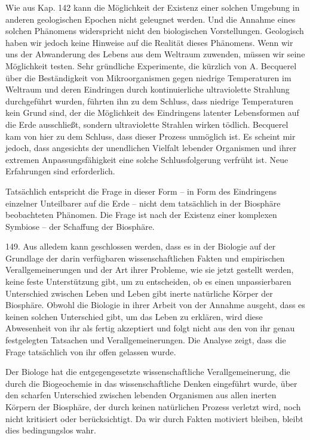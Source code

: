 \documentclass[11pt,a4paper]{book}
\begin{document}
Wie aus Kap. 142 kann die Möglichkeit der Existenz einer solchen Umgebung in anderen geologischen Epochen nicht geleugnet werden. Und die Annahme eines solchen Phänomens widerspricht nicht den biologischen Vorstellungen. Geologisch haben wir jedoch keine Hinweise auf die Realität dieses Phänomens. Wenn wir uns der Abwanderung des Lebens aus dem Weltraum zuwenden, müssen wir seine Möglichkeit testen. Sehr gründliche Experimente, die kürzlich von A. Becquerel über die Beständigkeit von Mikroorganismen gegen niedrige Temperaturen im Weltraum und deren Eindringen durch kontinuierliche ultraviolette Strahlung durchgeführt wurden, führten ihn zu dem Schluss, dass niedrige Temperaturen kein Grund sind, der die Möglichkeit des Eindringens latenter Lebensformen auf die Erde ausschließt, sondern ultraviolette Strahlen wirken tödlich. Becquerel kam von hier zu dem Schluss, dass dieser Prozess unmöglich ist. Es scheint mir jedoch, dass angesichts der unendlichen Vielfalt lebender Organismen und ihrer extremen Anpassungsfähigkeit eine solche Schlussfolgerung verfrüht ist. Neue Erfahrungen sind erforderlich.



Tatsächlich entspricht die Frage in dieser Form -- in Form des Eindringens einzelner Unteilbarer auf die Erde -- nicht dem tatsächlich in der Biosphäre beobachteten Phänomen. Die Frage ist nach der Existenz einer komplexen Symbiose -- der Schaffung der Biosphäre.



149. Aus alledem kann geschlossen werden, dass es in der Biologie auf der Grundlage der darin verfügbaren wissenschaftlichen Fakten und empirischen Verallgemeinerungen und der Art ihrer Probleme, wie sie jetzt gestellt werden, keine feste Unterstützung gibt, um zu entscheiden, ob es einen unpassierbaren Unterschied zwischen Leben und Leben gibt inerte natürliche Körper der Biosphäre. Obwohl die Biologie in ihrer Arbeit von der Annahme ausgeht, dass es keinen solchen Unterschied gibt, um das Leben zu erklären, wird diese Abwesenheit von ihr als fertig akzeptiert und folgt nicht aus den von ihr genau festgelegten Tatsachen und Verallgemeinerungen. Die Analyse zeigt, dass die Frage tatsächlich von ihr offen gelassen wurde.



Der Biologe hat die entgegengesetzte wissenschaftliche Verallgemeinerung, die durch die Biogeochemie in das wissenschaftliche Denken eingeführt wurde, über den scharfen Unterschied zwischen lebenden Organismen aus allen inerten Körpern der Biosphäre, der durch keinen natürlichen Prozess verletzt wird, noch nicht kritisiert oder berücksichtigt. Da wir durch Fakten motiviert bleiben, bleibt dies bedingungslos wahr.
\end{document}
